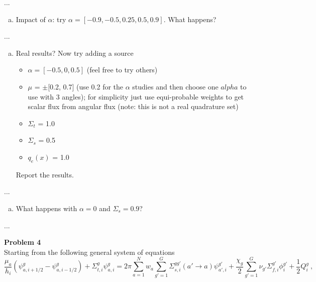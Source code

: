 \documentclass[10pt]{article}
\begin{document}
...



%
%
%

\begin{enumerate}[(b)]
\item Impact of $\alpha$: try $\alpha = [-0.9, -0.5, 0.25, 0.5, 0.9]$. What happens?
\end{enumerate}

...



%
%
%

\begin{enumerate}[(c)]
\item Real results? Now try adding a source
\begin{itemize}
\setlength\itemsep{0em}
\item $\alpha = [-0.5, 0, 0.5]$ (feel free to try others)
\item $\mu$ = $\pm$[0.2, 0.7] (use 0.2 for the $\alpha$ studies and then choose one $alpha$ to use with 3 angles); for simplicity just use equi-probable weights to get scalar flux from angular flux (note: this is not a real quadrature set)
\item $\Sigma_t$ = 1.0
\item $\Sigma_s$ = 0.5
\item $q_e(x)$ = 1.0
\end{itemize}
Report the results.
\end{enumerate}

...



%
%
%

\begin{enumerate}[(d)]
\item What happens with $\alpha = 0$ and $\Sigma_s = 0.9$?
\end{enumerate}

...





\newpage
\noindent \textbf{Problem 4}\\
Starting from the following general system of equations
%
\begin{equation*}
\frac{\mu_a}{h_i}(\psi_{a,i+1/2}^g - \psi_{a,i-1/2}^g)+ \Sigma_{t,i}^g\psi_{a,i}^g = 2\pi\sum_{a=1}^N w_a \sum_{g'=1}^G \Sigma_{s, i}^{gg'}(a'\rightarrow a)\psi_{a',i}^{g'} + \frac{\chi_g}{2}\sum_{g'=1}^G \nu_{g'}\Sigma_{f,i}^{g'} \phi_{i}^{g'} + \frac{1}{2}Q_i^g\:,
\end{equation*}
\end{document}
